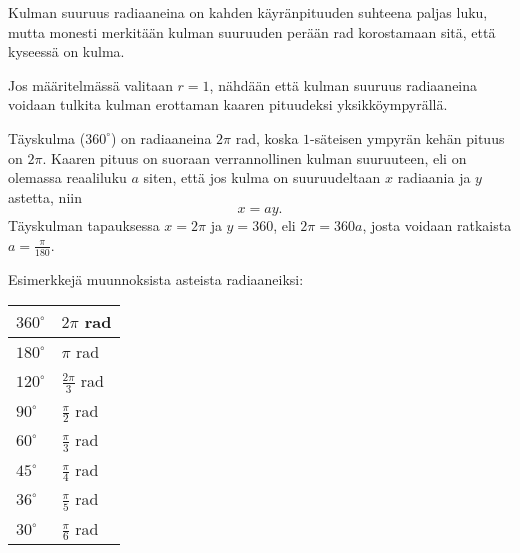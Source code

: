 Kulman suuruus radiaaneina on kahden käyränpituuden suhteena paljas luku, mutta monesti merkitään kulman suuruuden perään rad korostamaan sitä, että kyseessä on kulma.

Jos määritelmässä valitaan $r = 1$, nähdään että kulman suuruus radiaaneina voidaan tulkita kulman erottaman kaaren pituudeksi yksikköympyrällä.

Täyskulma ($360^\circ$) on radiaaneina $2\pi$ rad, koska $1$-säteisen ympyrän kehän pituus on $2\pi$. Kaaren pituus on suoraan verrannollinen kulman suuruuteen, eli on olemassa reaaliluku $a$ siten, että jos kulma on suuruudeltaan $x$ radiaania ja $y$ astetta, niin
\[x = a y.\]
Täyskulman tapauksessa $x = 2\pi$ ja $y = 360$, eli $2\pi = 360 a$, josta voidaan ratkaista $a = \frac{\pi}{180}$.


Esimerkkejä muunnoksista asteista radiaaneiksi: \\
\begin{tabular}{|l|l|}
\hline
$360^\circ$ & $2\pi$ rad \\
\hline
$180^\circ$ & $\pi$ rad \\
\hline
$120^\circ$ & $\frac{2\pi}{3}$ rad \\
\hline
$90^\circ$ & $\frac{\pi}{2}$ rad \\
\hline
$60^\circ$ & $\frac{\pi}{3}$ rad \\
\hline
$45^\circ$ & $\frac{\pi}{4}$ rad \\
\hline
$36^\circ$ & $\frac{\pi}{5}$ rad \\
\hline
$30^\circ$ & $\frac{\pi}{6}$ rad \\
\hline
\end{tabular}

